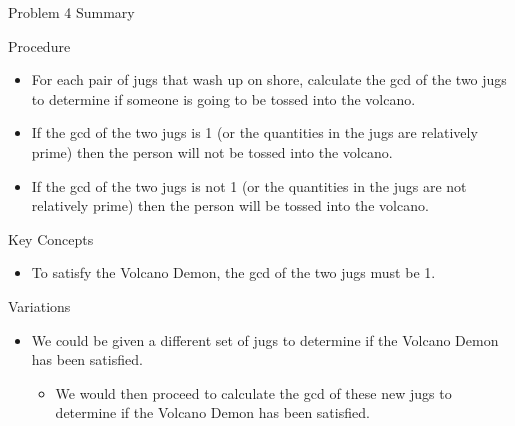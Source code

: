 \begin{summary}{Problem 4 Summary}
    \begin{statement}{Procedure}
        \begin{itemize}
            \item For each pair of jugs that wash up on shore, calculate the gcd of the two jugs to determine if someone is going to be tossed into the volcano.
            \item If the gcd of the two jugs is 1 (or the quantities in the jugs are relatively prime) then the person will not be tossed into the volcano.
            \item If the gcd of the two jugs is not 1 (or the quantities in the jugs are not relatively prime) then the person will be tossed into the volcano.
        \end{itemize}
    \end{statement}
    \begin{statement}{Key Concepts}
        \begin{itemize}
            \item To satisfy the Volcano Demon, the gcd of the two jugs must be 1.
        \end{itemize}
    \end{statement}
    \begin{statement}{Variations}
        \begin{itemize}
            \item We could be given a different set of jugs to determine if the Volcano Demon has been satisfied.
            \begin{itemize}
                \item We would then proceed to calculate the gcd of these new jugs to determine if the Volcano Demon has been satisfied.
            \end{itemize}
        \end{itemize}
    \end{statement}
\end{summary}

